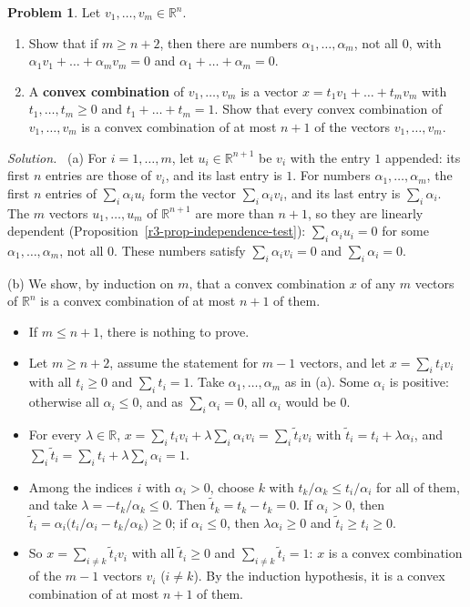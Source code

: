 \documentclass[12pt]{article}
\newcommand{\R}{\mathbb R}
\theoremstyle{definition}
\newtheorem{problem}{Problem}
\newenvironment{solution}{\par\noindent\textit{Solution.}\ }{\par\smallskip}
\begin{document}
\begin{problem}\label{r3-ex-pr-caratheodory}
Let \(v_1,\dots,v_m\in\R^n\).
\begin{enumerate}
\item Show that if \(m\geqslant n+2\), then there are numbers \(\alpha_1,\dots,\alpha_m\), not all \(0\), with
\(\alpha_1v_1+\dots+\alpha_mv_m=0\) and \(\alpha_1+\dots+\alpha_m=0\).
\item A \textbf{convex combination} of \(v_1,\dots,v_m\) is a vector \(x=t_1v_1+\dots+t_mv_m\) with
\(t_1,\dots,t_m\geqslant0\) and \(t_1+\dots+t_m=1\). Show that every convex combination of \(v_1,\dots,v_m\) is a convex
combination of at most \(n+1\) of the vectors \(v_1,\dots,v_m\).
\end{enumerate}
\end{problem}
\begin{solution}
(a) For \(i=1,\dots,m\), let \(u_i\in\R^{n+1}\) be \(v_i\) with the entry \(1\) appended: its first \(n\) entries are
those of \(v_i\), and its last entry is \(1\). For numbers \(\alpha_1,\dots,\alpha_m\), the first \(n\) entries of
\(\sum_i\alpha_iu_i\) form the vector \(\sum_i\alpha_iv_i\), and its last entry is \(\sum_i\alpha_i\). The \(m\) vectors
\(u_1,\dots,u_m\) of \(\R^{n+1}\) are more than \(n+1\), so they are linearly dependent
(Proposition~\ref{r3-prop-independence-test}): \(\sum_i\alpha_iu_i=0\) for some \(\alpha_1,\dots,\alpha_m\), not all
\(0\). These numbers satisfy \(\sum_i\alpha_iv_i=0\) and \(\sum_i\alpha_i=0\).

(b) We show, by induction on \(m\), that a convex combination \(x\) of any \(m\) vectors of \(\R^n\) is a convex
combination of at most \(n+1\) of them.
\begin{itemize}
\item If \(m\leqslant n+1\), there is nothing to prove.
\item Let \(m\geqslant n+2\), assume the statement for \(m-1\) vectors, and let \(x=\sum_it_iv_i\) with all
\(t_i\geqslant0\) and \(\sum_it_i=1\). Take \(\alpha_1,\dots,\alpha_m\) as in (a). Some \(\alpha_i\) is positive:
otherwise all \(\alpha_i\leqslant0\), and as \(\sum_i\alpha_i=0\), all \(\alpha_i\) would be \(0\).
\item For every \(\lambda\in\R\), \(x=\sum_it_iv_i+\lambda\sum_i\alpha_iv_i=\sum_i\tilde t_iv_i\) with
\(\tilde t_i=t_i+\lambda\alpha_i\), and \(\sum_i\tilde t_i=\sum_it_i+\lambda\sum_i\alpha_i=1\).
\item Among the indices \(i\) with \(\alpha_i>0\), choose \(k\) with \(t_k/\alpha_k\leqslant t_i/\alpha_i\) for all of
them, and take \(\lambda=-t_k/\alpha_k\leqslant0\). Then \(\tilde t_k=t_k-t_k=0\). If \(\alpha_i>0\), then
\(\tilde t_i=\alpha_i\bigl(t_i/\alpha_i-t_k/\alpha_k\bigr)\geqslant0\); if \(\alpha_i\leqslant0\), then
\(\lambda\alpha_i\geqslant0\) and \(\tilde t_i\geqslant t_i\geqslant0\).
\item So \(x=\sum_{i\ne k}\tilde t_iv_i\) with all \(\tilde t_i\geqslant0\) and \(\sum_{i\ne k}\tilde t_i=1\): \(x\) is a convex
combination of the \(m-1\) vectors \(v_i\) (\(i\ne k\)). By the induction hypothesis, it is a convex combination of at
most \(n+1\) of them.
\end{itemize}
\end{solution}
\end{document}
